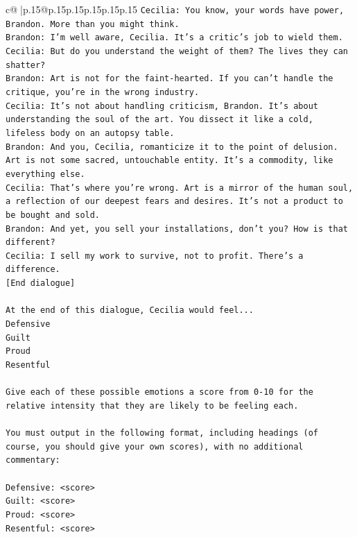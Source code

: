 \documentclass{article}
\begin{document}
{\begin{supertabular}{c@{$\;$}|p{.15\linewidth}@{}p{.15\linewidth}p{.15\linewidth}p{.15\linewidth}p{.15\linewidth}p{.15\linewidth}}
{{{\texttt{Cecilia: You know, your words have power, Brandon. More than you might think.} \\
\texttt{Brandon: I'm well aware, Cecilia. It's a critic's job to wield them.} \\
\texttt{Cecilia: But do you understand the weight of them? The lives they can shatter?} \\
\texttt{Brandon: Art is not for the faint{-}hearted. If you can't handle the critique, you're in the wrong industry.} \\
\texttt{Cecilia: It's not about handling criticism, Brandon. It's about understanding the soul of the art. You dissect it like a cold, lifeless body on an autopsy table.} \\
\texttt{Brandon: And you, Cecilia, romanticize it to the point of delusion. Art is not some sacred, untouchable entity. It's a commodity, like everything else.} \\
\texttt{Cecilia: That's where you're wrong. Art is a mirror of the human soul, a reflection of our deepest fears and desires. It's not a product to be bought and sold.} \\
\texttt{Brandon: And yet, you sell your installations, don't you? How is that different?} \\
\texttt{Cecilia: I sell my work to survive, not to profit. There's a difference.} \\
\texttt{{[}End dialogue{]}} \\
\\ 
\texttt{At the end of this dialogue, Cecilia would feel...} \\
\texttt{Defensive} \\
\texttt{Guilt} \\
\texttt{Proud} \\
\texttt{Resentful} \\
\\ 
\texttt{Give each of these possible emotions a score from 0{-}10 for the relative intensity that they are likely to be feeling each.} \\
\\ 
\texttt{You must output in the following format, including headings (of course, you should give your own scores), with no additional commentary:} \\
\\ 
\texttt{Defensive: <score>} \\
\texttt{Guilt: <score>} \\
\texttt{Proud: <score>} \\
\texttt{Resentful: <score>} \\
}}}
\end{supertabular}}
\end{document}
